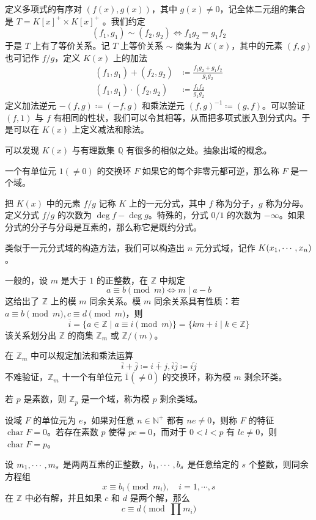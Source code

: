 定义多项式的有序对 $(f(x), g(x))$，其中 $g(x) \ne 0$，记全体二元组的集合是 $T = K[x]^+ \times K[x]^+$ 。我们约定
\[ (f_1,g_1) \sim (f_2,g_2) \Leftrightarrow f_1g_2 = g_1f_2 \]
于是 $T$ 上有了等价关系。记 $T$ 上等价关系 $\sim$ 商集为 $K(x)$，其中的元素 $(f,g)$ 也可记作 $f/g$，定义 $K(x)$ 上的加法
\begin{equation*}
	\begin{aligned}
		(f_1,g_1) + (f_2,g_2)     & \coloneqq \frac{f_1g_2+g_1f_2}{g_1g_2} \\
		(f_1,g_1) \cdot (f_2,g_2) & \coloneqq \frac{f_1f_2}{g_1g_2}
	\end{aligned}
\end{equation*}
定义加法逆元 $-(f,g) \coloneqq (-f,g)$ 和乘法逆元 $(f,g)^{-1} \coloneqq (g,f)$。可以验证 $(f,1)$ 与 $f$ 有相同的性状，我们可以令其相等，从而把多项式嵌入到分式内。于是可以在 $K(x)$ 上定义减法和除法。

可以发现 $K(x)$ 与有理数集 $\mathbb{Q}$ 有很多的相似之处。抽象出域的概念。

\begin{definition}[域]
	一个有单位元 $1 (\ne 0)$ 的交换环 $F$ 如果它的每个非零元都可逆，那么称 $F$ 是一个域。
\end{definition}

把 $K(x)$ 中的元素 $f/g$ 记称 $K$ 上的一元分式，其中 $f$ 称为分子，$g$ 称为分母。定义分式 $f/g$ 的次数为 $\deg f - \deg g$。特殊的，分式 $0/1$ 的次数为 $-\infty$。如果分式的分子与分母是互素的，那么称它是既约分式。

类似于一元分式域的构造方法，我们可以构造出 $n$ 元分式域，记作 $K(x_1,\cdots,x_n)$。

一般的，设 $m$ 是大于 $1$ 的正整数，在 $\mathbb{Z}$ 中规定
\[ a \equiv b \pmod m \Leftrightarrow m \mid a - b\]
这给出了 $\mathbb{Z}$ 上的模 $m$ 同余关系。模 $m$ 同余关系具有性质：若 $a \equiv b \pmod m, c \equiv d \pmod m$，则
\[ \overline{i} = \{ a \in \mathbb{Z} \mid a \equiv i \pmod m \} = \{ km + i \mid k \in \mathbb{Z} \} \]
该关系划分出 $\mathbb{Z}$ 的商集 $\mathbb{Z}_m$ 或 $\mathbb{Z}/(m)$。

在 $\mathbb{Z}_m$ 中可以规定加法和乘法运算
\[ \overline{i} + \overline{j} \coloneqq \overline{i+j}, \overline{i} \overline{j} \coloneqq \overline{ij} \]
不难验证，$\mathbb{Z}_m$ 十一个有单位元 $\overline{1} (\ne \overline{0})$ 的交换环，称为模 $m$ 剩余环类。

若 $p$ 是素数，则 $\mathbb{Z}_p$ 是一个域，称为模 $p$ 剩余类域。

\begin{definition}
	设域 $F$ 的单位元为 $e$，如果对任意 $n \in \mathbb{N}^+$ 都有 $ne \ne 0$，则称 $F$ 的特征 $\operatorname{char} F = 0$。若存在素数 $p$ 使得 $pe=0$，而对于 $0 < l < p$ 有 $le \ne 0$，则 $\operatorname{char} F = p$。
\end{definition}

\begin{theorem}[中国剩余定理]
	设 $m_1,\cdots,m_s$ 是两两互素的正整数，$b_1,\cdots,b_s$ 是任意给定的 $s$ 个整数，则同余方程组
	\[ x \equiv b_i \pmod {m_i}, \quad i = 1,\cdots,s \]
	在 $\mathbb{Z}$ 中必有解，并且如果 $c$ 和 $d$ 是两个解，那么
	\[ c \equiv d \pmod {\prod m_i} \]
\end{theorem}


